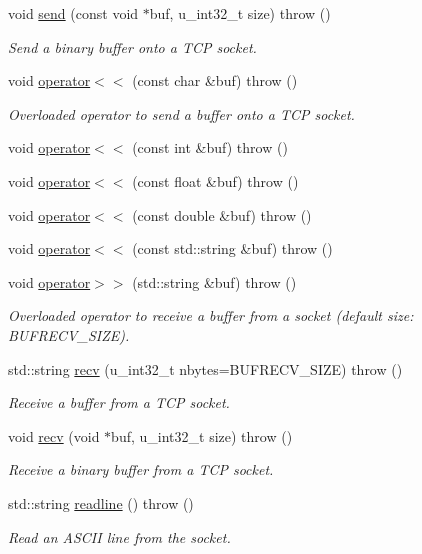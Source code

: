 \begin{CompactItemize}
void \hyperlink{classusock_1_1Socket_a42fa11f66d5f75f37c67f3a31d1ea81}{send} (const void $\ast$buf, u\_\-int32\_\-t size)  throw ()
\begin{CompactList}\small\item\em Send a binary buffer onto a TCP socket. \item\end{CompactList}\item 
void \hyperlink{classusock_1_1Socket_07ccbad3e0d485df8111aec584c2f38e}{operator$<$$<$} (const char \&buf)  throw ()
\begin{CompactList}\small\item\em Overloaded operator to send a buffer onto a TCP socket. \item\end{CompactList}\item 
void \hyperlink{classusock_1_1Socket_41c1bddf8c1cc6bf2b7c06d9da38ebad}{operator$<$$<$} (const int \&buf)  throw ()
\item 
void \hyperlink{classusock_1_1Socket_da103da3dcc47ab072efd471deb4aa17}{operator$<$$<$} (const float \&buf)  throw ()
\item 
void \hyperlink{classusock_1_1Socket_b1da84bc5e90631c85b85e12852b5399}{operator$<$$<$} (const double \&buf)  throw ()
\item 
void \hyperlink{classusock_1_1Socket_1887be63ebc540949cfadf18fa5d9532}{operator$<$$<$} (const std::string \&buf)  throw ()
\item 
void \hyperlink{classusock_1_1Socket_9796319ece2e7d7f7463608f00413457}{operator$>$$>$} (std::string \&buf)  throw ()
\begin{CompactList}\small\item\em Overloaded operator to receive a buffer from a socket (default size: BUFRECV\_\-SIZE). \item\end{CompactList}\item 
std::string \hyperlink{classusock_1_1Socket_be79db8987d9d0dd3a534fca7a84f0f9}{recv} (u\_\-int32\_\-t nbytes=BUFRECV\_\-SIZE)  throw ()
\begin{CompactList}\small\item\em Receive a buffer from a TCP socket. \item\end{CompactList}\item 
void \hyperlink{classusock_1_1Socket_852c343031c5516f747577ee6f3fc96e}{recv} (void $\ast$buf, u\_\-int32\_\-t size)  throw ()
\begin{CompactList}\small\item\em Receive a binary buffer from a TCP socket. \item\end{CompactList}\item 
std::string \hyperlink{classusock_1_1Socket_179bbc1c0b837c0e73c22c1b9bc149eb}{readline} ()  throw ()
\begin{CompactList}\small\item\em Read an ASCII line from the socket. \item\end{CompactList}\end{CompactItemize}


